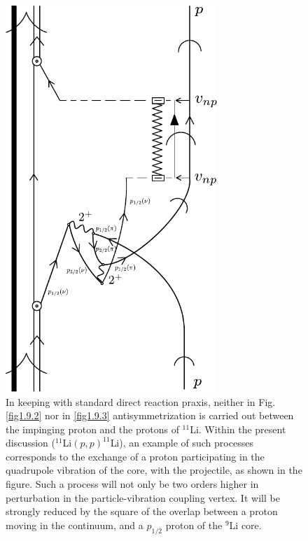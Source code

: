                \begin{figure}
               \centerline {
               \includegraphics*[width=8cm]{introduccion/figs/fig1_9_4}
               }
               \caption{In keeping with standard direct reaction praxis, neither in Fig. \ref{fig1.9.2} nor in
               \ref{fig1.9.3} antisymmetrization is carried out between the impinging proton and the protons
               of $^{11}$Li. Within the present discussion
               ($^{11}$Li$(p,p)^{11}$Li), an example of such processes corresponds to the exchange
               of a proton participating in the quadrupole vibration of the core, with the projectile, as
               shown in the figure. Such a process will not only be two orders higher in perturbation
               in the particle-vibration coupling vertex. It will be strongly reduced by the square of
               the overlap between a proton moving in the continuum, and a $p_{1/2}$ proton of the $^{9}$Li
               core.}
               \label{fig1.9.4}
               \end{figure}
          
